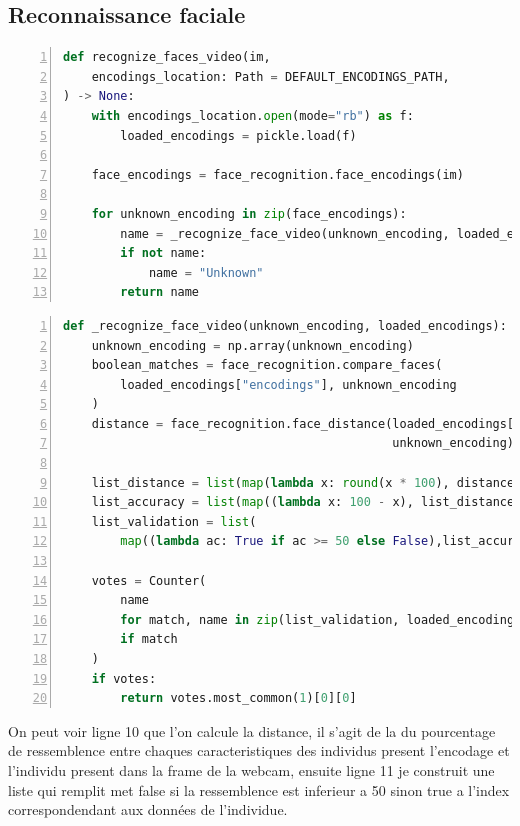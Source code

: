 \documentclass{article}
\begin{document}
\newpage
\subsection{Reconnaissance faciale}

\begin{lstlisting}[language=python, caption={Fonction chapeau va reconnaitre l'individu présent sur l'image }, label=code:exemple, numbers=left, frame=single, framerule=1pt, linewidth=\textwidth]
    def recognize_faces_video(im,
    encodings_location: Path = DEFAULT_ENCODINGS_PATH,
) -> None:
    with encodings_location.open(mode="rb") as f:
        loaded_encodings = pickle.load(f)

    face_encodings = face_recognition.face_encodings(im)

    for unknown_encoding in zip(face_encodings):
        name = _recognize_face_video(unknown_encoding, loaded_encodings)
        if not name:
            name = "Unknown"
        return name
\end{lstlisting}

\begin{lstlisting}[language=python, caption={Fonction qui va comparé les caracteristiques d'un individu avec la base de données encodé }, label=code:exemple, numbers=left, frame=single, framerule=1pt, linewidth=\textwidth]
    def _recognize_face_video(unknown_encoding, loaded_encodings):
    unknown_encoding = np.array(unknown_encoding)
    boolean_matches = face_recognition.compare_faces(
        loaded_encodings["encodings"], unknown_encoding
    )
    distance = face_recognition.face_distance(loaded_encodings["encodings"],
                                              unknown_encoding)
    
    list_distance = list(map(lambda x: round(x * 100), distance))
    list_accuracy = list(map((lambda x: 100 - x), list_distance))
    list_validation = list(
        map((lambda ac: True if ac >= 50 else False),list_accuracy))
    
    votes = Counter(
        name
        for match, name in zip(list_validation, loaded_encodings["names"])
        if match
    )
    if votes:
        return votes.most_common(1)[0][0]
\end{lstlisting}

On peut voir ligne 10 que l'on calcule la distance, il s'agit de la du pourcentage de ressemblence entre chaques caracteristiques des individus present l'encodage et l'individu present
dans la frame de la webcam, ensuite ligne 11 je construit une liste qui remplit met false si la ressemblence est inferieur a 50 sinon true a l'index correspondendant aux données de l'individue.
\end{document}
